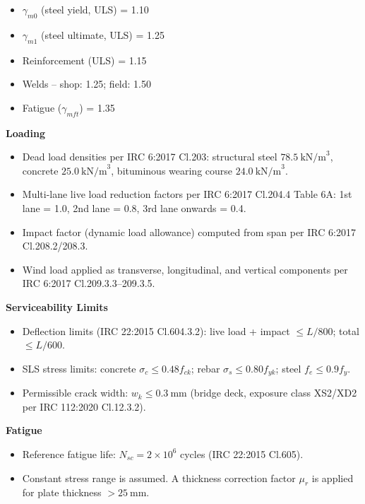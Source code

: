 \documentclass[12pt,a4paper]{report}
\numberwithin{table}{chapter}
\numberwithin{figure}{chapter}
\begin{document}
\begin{itemize}
\item $\gamma_{m0}$ (steel yield, ULS) = 1.10
\item $\gamma_{m1}$ (steel ultimate, ULS) = 1.25
\item Reinforcement (ULS) = 1.15
\item Welds -- shop: 1.25; field: 1.50
\item Fatigue ($\gamma_{mft}$) = 1.35
\end{itemize}

\textbf{Loading}

\begin{itemize}
\item Dead load densities per IRC 6:2017 Cl.203: structural steel $78.5 \ \text{kN/m}^3$, concrete $25.0 \ \text{kN/m}^3$, bituminous wearing course $24.0 \ \text{kN/m}^3$.
\item Multi-lane live load reduction factors per IRC 6:2017 Cl.204.4 Table 6A: 1st lane = 1.0, 2nd lane = 0.8, 3rd lane onwards = 0.4.
\item Impact factor (dynamic load allowance) computed from span per IRC 6:2017 Cl.208.2/208.3.
\item Wind load applied as transverse, longitudinal, and vertical components per IRC 6:2017 Cl.209.3.3--209.3.5.
\end{itemize}

\textbf{Serviceability Limits}

\begin{itemize}
\item Deflection limits (IRC 22:2015 Cl.604.3.2): live load + impact $\leq L/800$; total $\leq L/600$.
\item SLS stress limits: concrete $\sigma_c \leq 0.48 f_{ck}$; rebar $\sigma_s \leq 0.80 f_{yk}$; steel $f_e \leq 0.9 f_y$.
\item Permissible crack width: $w_k \leq 0.3 \ \text{mm}$ (bridge deck, exposure class XS2/XD2 per IRC 112:2020 Cl.12.3.2).
\end{itemize}

\textbf{Fatigue}

\begin{itemize}
\item Reference fatigue life: $N_{sc} = 2 \times 10^6$ cycles (IRC 22:2015 Cl.605).
\item Constant stress range is assumed. A thickness correction factor $\mu_r$ is applied for plate thickness $> 25 \ \text{mm}$.
\end{itemize}
\end{document}
